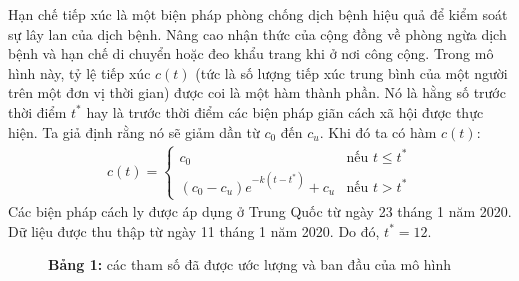 \documentclass[../main.tex]{subfiles}
\begin{document}
Hạn chế tiếp xúc là một biện pháp phòng chống dịch bệnh hiệu quả để kiểm soát sự lây lan của dịch bệnh. Nâng cao nhận thức của cộng đồng về phòng ngừa dịch bệnh và hạn chế di chuyển hoặc đeo khẩu trang khi ở nơi công cộng. Trong mô hình này, tỷ lệ tiếp xúc $c(t)$ (tức là số lượng tiếp xúc trung bình của một người trên một đơn vị thời gian) được coi là một hàm thành phần. Nó là hằng số trước thời điểm $t^*$ hay là trước thời điểm các biện pháp giãn cách xã hội được thực hiện. Ta giả định rằng nó sẽ giảm dần từ $c_0$ đến $c_u$. Khi đó ta có hàm $c(t)$:
\begin{align*}
    c(t) = 
    \begin{cases}
    c_0  & \mbox{nếu } t \leq t^* \\
    (c_0 -c_u)e^{-k(t-t^*)}+c_u & \mbox{nếu } t > t^*
    \end{cases}
\end{align*}
Các biện pháp cách ly được áp dụng ở Trung Quốc từ ngày 23 tháng 1 năm 2020. Dữ liệu được thu thập từ ngày 11 tháng 1 năm 2020. Do đó, $t^*=12$.
\begin{figure}[H]
    \centering
    \caption*{\textbf{Bảng 1:} các tham số đã được ước lượng và ban đầu của mô hình}
    \resizebox{15cm}{!}{}
    \label{table:1}
\end{figure}
\end{document}
